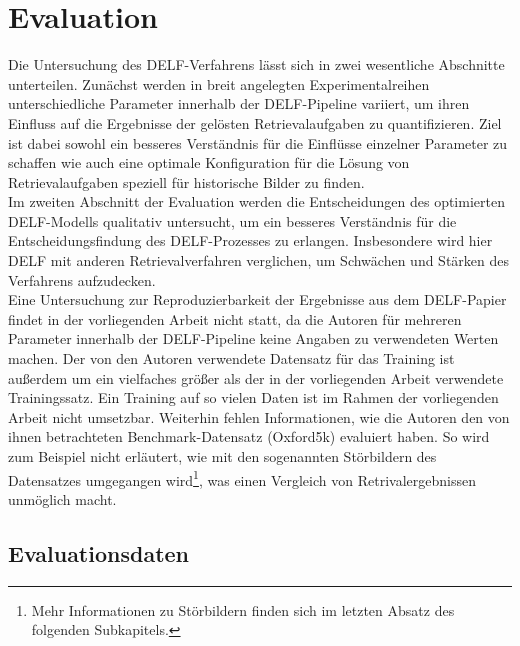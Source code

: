\chapter{Evaluation}

Die Untersuchung des DELF-Verfahrens lässt sich in zwei wesentliche Abschnitte unterteilen. Zunächst werden in breit angelegten Experimentalreihen unterschiedliche Parameter innerhalb der DELF-Pipeline variiert, um ihren Einfluss auf die Ergebnisse der gelösten Retrievalaufgaben zu quantifizieren. Ziel ist dabei sowohl ein besseres Verständnis für die Einflüsse einzelner Parameter zu schaffen wie auch eine optimale Konfiguration für die Lösung von Retrievalaufgaben speziell für historische Bilder zu finden. \\
Im zweiten Abschnitt der Evaluation werden die Entscheidungen des optimierten DELF-Modells qualitativ untersucht, um ein besseres Verständnis für die Entscheidungsfindung des DELF-Prozesses zu erlangen. Insbesondere wird hier DELF mit anderen Retrievalverfahren verglichen, um Schwächen und Stärken des Verfahrens aufzudecken. \\
Eine Untersuchung zur Reproduzierbarkeit der Ergebnisse aus dem DELF-Papier \cite{delf} findet in der vorliegenden Arbeit nicht statt, da die Autoren für mehreren Parameter innerhalb der DELF-Pipeline keine Angaben zu verwendeten Werten machen. Der von den Autoren verwendete Datensatz für das Training ist außerdem um ein vielfaches größer als der in der vorliegenden Arbeit verwendete Trainingssatz. Ein Training auf so vielen Daten ist im Rahmen der vorliegenden Arbeit nicht umsetzbar. Weiterhin fehlen Informationen, wie die Autoren den von ihnen betrachteten Benchmark-Datensatz (Oxford5k) evaluiert haben. So wird zum Beispiel nicht erläutert, wie mit den sogenannten Störbildern des Datensatzes umgegangen wird\footnote{Mehr Informationen zu Störbildern finden sich im letzten Absatz des folgenden Subkapitels.}, was einen Vergleich von Retrivalergebnissen unmöglich macht.
\section{Evaluationsdaten}

